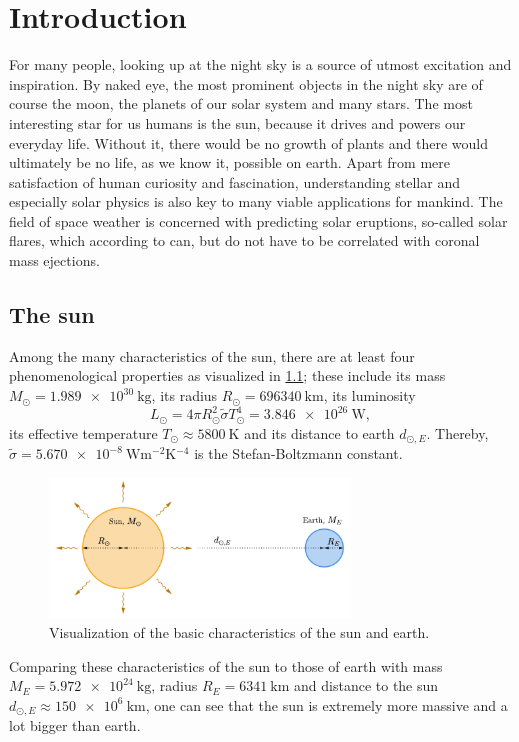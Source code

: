 \documentclass[a4paper,12pt]{report}
\begin{document}

\thispagestyle{empty}
\newpage
\thispagestyle{empty}

\newpage
{}
\tableofcontents
\FloatBarrier
\newpage
{}
\setcounter{page}{1}

\chapter{Introduction}
For many people, looking up at the night sky is a source of utmost excitation and inspiration. By naked eye, the most prominent objects in the night sky are of course the moon, the planets of our solar system and many stars. The most interesting star for us humans is the sun, because it drives and powers our everyday life. Without it, there would be no growth of plants and there would ultimately be no life, as we know it, possible on earth. Apart from mere satisfaction of human curiosity and fascination, understanding stellar and especially solar physics is also key to many viable applications for mankind. The field of space weather is concerned with predicting solar eruptions, so-called solar flares, which according to \cite[p.436]{Stix.2002} can, but do not have to be correlated with coronal mass ejections.

\section{The sun}
Among the many characteristics of the sun, there are at least four phenomenological properties as visualized in \cref{fig:sunearth}; these include its mass $M_\odot = \SI{1.989e30}{\kilogram}$, its radius $R_\odot = \SI{696340}{\kilo\meter}$, its luminosity \begin{equation}L_\odot = 4\pi R_\odot^2 \tilde{\sigma} T_\odot^4 = \SI{3.846e26}{\watt},
\end{equation} its effective temperature $T_{\odot} \approx \SI{5800}{\kelvin}$ and its distance to earth $d_{\odot,E}$. Thereby, $\tilde{\sigma} = \SI{5.670e-8}{\watt\meter^{-2}\kelvin^{-4}}$ is the Stefan-Boltzmann constant.
\begin{figure}[h]
\centering
\includegraphics[width=8cm]{figures/sunearth.pdf}
\caption{Visualization of the basic characteristics of the sun and earth.}
\label{fig:sunearth}
\end{figure}
Comparing these characteristics of the sun to those of earth with mass $M_E = \SI{5.972e24}{\kilogram}$, radius $R_E = \SI{6341}{\kilo\meter}$ and distance to the sun $d_{\odot,E} \approx \SI{150e6}{\kilo\meter}$, one can see that the sun is extremely more massive and a lot bigger than earth.
\end{document}

